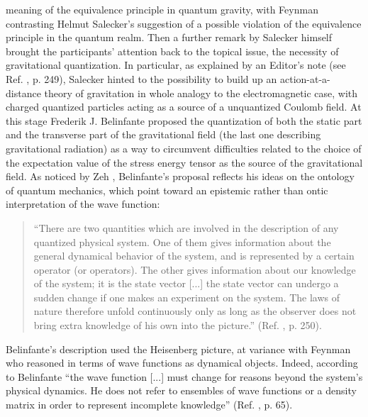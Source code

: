 \documentclass{ws-procs961x669}            %
\begin{document}
meaning of the equivalence principle in quantum gravity, with
Feynman contrasting Helmut Salecker's suggestion of a possible
violation of the equivalence principle in the quantum realm. Then
a further remark by Salecker himself brought the participants'
attention back to the topical issue, the necessity of
gravitational quantization. In particular, as explained by an
Editor's note (see Ref. , p. 249), Salecker
hinted to the possibility to build up an action-at-a-distance
theory of gravitation in whole analogy to the electromagnetic
case, with charged quantized particles acting as a source of a
unquantized Coulomb field. At this stage Frederik J. Belinfante
proposed the quantization of both the static part and the
transverse part of the gravitational field (the last one
describing gravitational radiation) as a way to circumvent
difficulties related to the choice of the expectation value of the
stress energy tensor as the source of the gravitational field. As
noticed by Zeh \cite{Zeh}, Belinfante's proposal reflects his
ideas on the ontology of quantum mechanics, which point toward an
epistemic rather than ontic interpretation of the wave function:
%
\begin{quote}
``There are two quantities which are involved in the description
of any quantized physical system. One of them gives information
about the general dynamical behavior of the system, and is
represented by a certain operator (or operators). The other gives
information about our knowledge of the system; it is the state
vector [...] the state vector can undergo a sudden change if one
makes an experiment on the system. The laws of nature therefore
unfold continuously only as long as the observer does not bring
extra knowledge of his own into the picture.'' (Ref.
, p. 250).
\end{quote}
%
Belinfante's description used the Heisenberg picture, at variance
with Feynman who reasoned in terms of wave functions as dynamical
objects. Indeed, according to Belinfante ``the wave function [...]
must change for reasons beyond the system's physical dynamics. He
does not refer to ensembles of wave functions or a density matrix
in order to represent incomplete knowledge'' (Ref. ,
p. 65).
\end{document}
